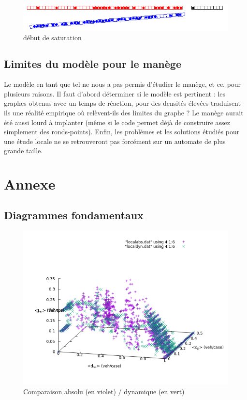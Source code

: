 \documentclass[11pt]{article}
\begin{document}
	\begin{figure}
		\begin{center}
			\includegraphics[scale=0.4]{./images/localsature}
		\end{center}
		\caption{\label{dsat}début de saturation}
	\end{figure}

	 
	\subsection{Limites du modèle pour le manège}
Le modèle en tant que tel ne nous a pas permis d'étudier le manège, et ce, pour plusieurs raisons. Il faut d'abord déterminer si le modèle est pertinent : les graphes obtenus avec un temps de réaction, pour des densités élevées traduisent-ils une réalité empirique où relèvent-ils des limites du graphe ? Le manège aurait été aussi lourd à implanter (même si le code permet déjà de construire assez simplement des ronds-points). Enfin, les problèmes et les solutions étudiés pour une étude locale ne se retrouveront pas forcément sur un automate de plus grande taille.
	
\renewcommand{\refname}{Bibliographie}


	
	
\section{Annexe}
	\subsection{Diagrammes fondamentaux}
	
\begin{figure}[h]
	\begin{center}
		\includegraphics[scale=0.4]{./diagrammes-fondamentaux/localabsdyn0w}
	\end{center}
\caption{\label{prres}Comparaison absolu (en violet) / dynamique (en vert)}
\end{figure}	
	
\end{document}
